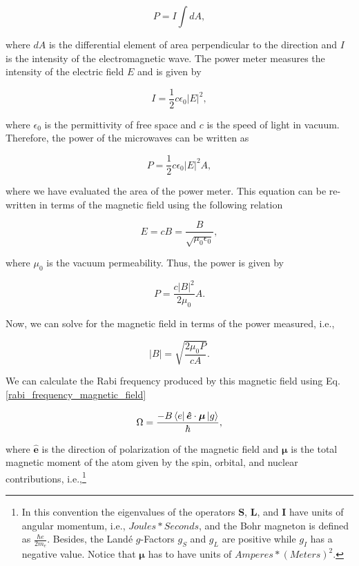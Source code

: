 \documentclass{article}
\begin{document}
\begin{equation}
    P = I \int dA,
\end{equation}

where $dA$ is the differential element of area perpendicular to the direction and $I$ is the intensity of the electromagnetic wave. The power meter measures the intensity of the electric field $E$ and is given by

\begin{equation}
    I = \frac{1}{2} c \epsilon_{0} |E|^{2},
\end{equation}

where $\epsilon_{0}$ is the permittivity of free space and $c$ is the speed of light in vacuum. Therefore, the power of the microwaves can be written as

\begin{equation}
    P = \frac{1}{2} c \epsilon_{0} |E|^{2} A,
\end{equation}

where we have evaluated the area of the power meter. This equation can be re-written in terms of the magnetic field using the following relation

\begin{equation}
    E = c B = \frac{B}{\sqrt{\mu_{0} \epsilon_{0}}},
\end{equation}

where $\mu_{0}$ is the vacuum permeability. Thus, the power is given by

\begin{equation}\label{power_in_terms_of_B}
    P = \frac{c |B|^{2}}{2 \mu_{0}} A.
\end{equation}

Now, we can solve for the magnetic field in terms of the power measured, i.e.,

\begin{equation}
    |B| = \sqrt{\frac{2 \mu_{0} P}{c A}}.
\end{equation}

We can calculate the Rabi frequency produced by this magnetic field using Eq. \ref{rabi_frequency_magnetic_field}

\begin{equation*}
\Omega = \frac{- B \bra{e} \boldsymbol{\hat{e}} \cdot \boldsymbol{\mu} \ket{g}}{\hbar},
\end{equation*}

where $\boldsymbol{\hat{e}}$ is the direction of polarization of the magnetic field and $\boldsymbol{\mu}$ is the total magnetic moment of the atom given by the spin, orbital, and nuclear contributions, i.e.,\footnote{In this convention the eigenvalues of the operators $\boldsymbol{S}$, $\boldsymbol{L}$, and $\boldsymbol{I}$ have units of angular momentum, i.e., $Joules*Seconds$, and the Bohr magneton is defined as $\frac{\hbar e}{2 m_{e}}$. Besides, the Landé $g$-Factors $g_{S}$ and $g_{L}$ are positive while $g_{I}$ has a negative value. Notice that $\boldsymbol{\mu}$ has to have units of $Amperes*(Meters)^2$.}
\end{document}
